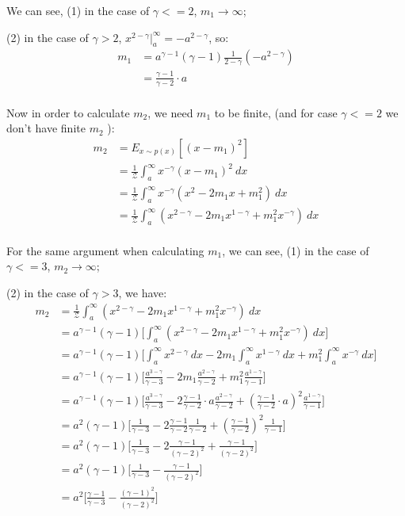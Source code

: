 We can see, (1) in the case of $\gamma<=2$, $m_1 \rightarrow \infty$; 

(2) in the case of $\gamma>2$, $x^{2-\gamma} |_a^{\infty}=-a^{2-\gamma}$, so:
\begin{align*}
    m_1 
    &= a^{\gamma-1} (\gamma-1) \frac{1}{2-\gamma} (-a^{2-\gamma}) \\
    &= \frac{\gamma-1}{\gamma-2} \cdot a \\
\end{align*}

Now in order to calculate $m_2$, we need $m_1$ to be finite, (and for case $\gamma<=2$ we don't have finite $m_2$ ):
\begin{align*}
    m_2 &= E_{x \sim p(x)}[(x-m_1)^2] \\
    &= \frac{1}{\mathcal{Z}} \int_{a}^{\infty} x^{-\gamma} (x-m_1)^2 \ dx \\
    &= \frac{1}{\mathcal{Z}} \int_{a}^{\infty} x^{-\gamma} (x^2 - 2 m_1 x + m_1 ^2) \ dx \\
    &= \frac{1}{\mathcal{Z}} \int_{a}^{\infty} (x^{2-\gamma} - 2 m_1 x^{1-\gamma} + m_1 ^2 x^{-\gamma}) \ dx \\
\end{align*}

For the same argument when calculating $m_1$, we can see, (1) in the case of $\gamma<=3$, $m_2 \rightarrow \infty$;

(2) in the case of $\gamma>3$, we have:
\begin{align*}
    m_2 &= \frac{1}{\mathcal{Z}} \int_{a}^{\infty} (x^{2-\gamma} - 2 m_1 x^{1-\gamma} + m_1 ^2 x^{-\gamma}) \ dx \\
    &= a^{\gamma-1} (\gamma-1) \biggr[ \int_{a}^{\infty} (x^{2-\gamma} - 2 m_1 x^{1-\gamma} + m_1 ^2 x^{-\gamma}) \ dx \biggr] \\
    &= a^{\gamma-1} (\gamma-1) \biggr[ \int_{a}^{\infty} x^{2-\gamma} \ dx - 2 m_1 \int_{a}^{\infty} x^{1-\gamma} \ dx + m_1 ^2 \int_{a}^{\infty} x^{-\gamma} \ dx \biggr] \\
    &= a^{\gamma-1} (\gamma-1) \biggr[ \frac{a^{3-\gamma}}{\gamma-3} - 2 m_1 \frac{a^{2-\gamma}}{\gamma-2} + m_1 ^2 \frac{a^{1-\gamma}}{\gamma-1} \biggr] \\
    &= a^{\gamma-1} (\gamma-1) \biggr[ \frac{a^{3-\gamma}}{\gamma-3} - 2 \frac{\gamma-1}{\gamma-2} \cdot a \frac{a^{2-\gamma}}{\gamma-2} + (\frac{\gamma-1}{\gamma-2} \cdot a)^2 \frac{a^{1-\gamma}}{\gamma-1} \biggr] \\
    &= a^2 (\gamma-1) \biggr[ \frac{1}{\gamma-3} - 2 \frac{\gamma-1}{\gamma-2} \frac{1}{\gamma-2} + (\frac{\gamma-1}{\gamma-2})^2 \frac{1}{\gamma-1} \biggr] \\
    &= a^2 (\gamma-1) \biggr[ \frac{1}{\gamma-3} - 2 \frac{\gamma-1}{(\gamma-2)^2} + \frac{\gamma-1}{(\gamma-2)^2} \biggr] \\
    &= a^2 (\gamma-1) \biggr[ \frac{1}{\gamma-3} - \frac{\gamma-1}{(\gamma-2)^2} \biggr] \\
    &= a^2 \biggr[ \frac{\gamma-1}{\gamma-3} - \frac{(\gamma-1)^2}{(\gamma-2)^2} \biggr] \\
\end{align*}

